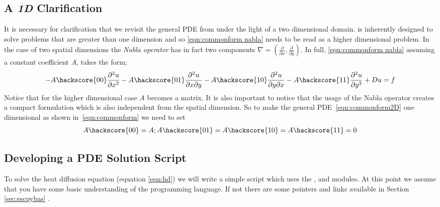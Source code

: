 \subsection{A \textit{1D} Clarification}
It is necessary for clarification that we revisit the general PDE from  under the light of a two dimensional domain. \esc is inherently designed to solve problems that are greater than one dimension and so \ref{eqn:commonform nabla} needs to be read as a higher dimensional problem. In the case of two spatial dimensions the \textit{Nabla operator} has in fact two components $\nabla = (\frac{\partial}{\partial x}, \frac{\partial}{\partial y})$. In full, \ref{eqn:commonform nabla} assuming a constant coefficient $A$, takes the form;
\begin{equation}\label{eqn:commonform2D}
-A\hackscore{00}\frac{\partial^{2}u}{\partial x^{2}} 
-A\hackscore{01}\frac{\partial^{2}u}{\partial x\partial y} 
-A\hackscore{10}\frac{\partial^{2}u}{\partial y\partial x} 
-A\hackscore{11}\frac{\partial^{2}u}{\partial y^{2}} 
+ Du = f
\end{equation}
Notice that for the higher dimensional case $A$ becomes a matrix. It is also
important to notice that the usage of the Nabla operator creates
a compact formulation which is also independent from the spatial dimension. 
So to make the general PDE~\ref{eqn:commonform2D} one dimensional as
shown in~\ref{eqn:commonform} we need to set
\begin{equation}
A\hackscore{00}=A; A\hackscore{01}=A\hackscore{10}=A\hackscore{11}=0
\end{equation}

\subsection{Developing a PDE Solution Script}
\label{sec:key}
To solve the heat diffusion equation (equation \ref{eqn:hd}) we will write a simple \pyt script which uses the \modescript, \modfinley and \modmpl modules. At this point we assume that you have some basic understanding of the \pyt programming language. If not there are some pointers and links available in Section \ref{sec:escpybas} .

